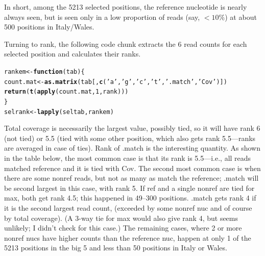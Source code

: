 \documentclass{article}\usepackage[]{graphicx}\usepackage[]{color}
\makeatletter
\newcommand{\hlnum}[1]{\textcolor[rgb]{0.686,0.059,0.569}{#1}}%
\newcommand{\hlstr}[1]{\textcolor[rgb]{0.192,0.494,0.8}{#1}}%
\newcommand{\hlstd}[1]{\textcolor[rgb]{0.345,0.345,0.345}{#1}}%
\newcommand{\hlkwa}[1]{\textcolor[rgb]{0.161,0.373,0.58}{\textbf{#1}}}%
\newcommand{\hlkwb}[1]{\textcolor[rgb]{0.69,0.353,0.396}{#1}}%
\newcommand{\hlkwc}[1]{\textcolor[rgb]{0.333,0.667,0.333}{#1}}%
\newcommand{\hlkwd}[1]{\textcolor[rgb]{0.737,0.353,0.396}{\textbf{#1}}}%
\newenvironment{kframe}{%
 \def\at@end@of@kframe{}%
 \ifinner\ifhmode%
  \def\at@end@of@kframe{\end{minipage}}%
  \begin{minipage}{\columnwidth}%
 \fi\fi%
 \def\FrameCommand##1{\hskip\@totalleftmargin \hskip-\fboxsep
 \colorbox{shadecolor}{##1}\hskip-\fboxsep
     \hskip-\linewidth \hskip-\@totalleftmargin \hskip\columnwidth}%
 \MakeFramed {\advance\hsize-\width
   \@totalleftmargin\z@ \linewidth\hsize
   \@setminipage}}%
 {\par\unskip\endMakeFramed%
 \at@end@of@kframe}
\newenvironment{knitrout}{}{} %
\makeatother
\begin{document}
In short, among the 5213 selected positions, the reference nucleotide is nearly always seen, but is seen only in a low proportion of reads (say, $<10\%$) at about 500 positions in Italy/Wales.

Turning to rank, the following code chunk extracts the 6 read counts for each selected position and calculates their ranks.   

\begin{knitrout}\footnotesize
{}\color{fgcolor}\begin{kframe}
\begin{alltt}
\hlstd{rankem} \hlkwb{<-} \hlkwa{function}\hlstd{(}\hlkwc{tab}\hlstd{)\{}
  \hlstd{count.mat} \hlkwb{<-} \hlkwd{as.matrix}\hlstd{(tab[,}\hlkwd{c}\hlstd{(}\hlstr{'a'}\hlstd{,}\hlstr{'g'}\hlstd{,}\hlstr{'c'}\hlstd{,}\hlstr{'t'}\hlstd{,}\hlstr{'.match'}\hlstd{,} \hlstr{'Cov'}\hlstd{)])}
  \hlkwd{return}\hlstd{(}\hlkwd{t}\hlstd{(}\hlkwd{apply}\hlstd{(count.mat,}\hlnum{1}\hlstd{,rank)))}
\hlstd{\}}
\hlstd{selrank} \hlkwb{<-} \hlkwd{lapply}\hlstd{(seltab,rankem)}
\end{alltt}
\end{kframe}
\end{knitrout}

Total coverage is necessarily the largest value, possibly tied, so it will have rank 6 (not tied) or 5.5 (tied with some other position, which also gets rank 5.5---ranks are averaged in case of ties).  Rank of .match is the interesting quantity.  As shown in the table below, the most common case is that its rank is 5.5---i.e., all reads matched reference and it is tied with Cov.  The second most common case is when there are some nonref reads, but not as many as match the reference; .match will be second largest in this case, with rank 5.    If ref and a single nonref are tied for max, both get rank 4.5; this happened in 49--300 positions.  .match gets rank 4 if it is the second largest read count, (exceeded by some nonref nuc and of course by total coverage).  (A 3-way tie for max would also give rank 4, but seems unlikely; I didn't check for this case.)  The remaining cases, where 2 or more nonref nucs have higher counts than the reference nuc, happen at only 1 of the 5213 positions in the big 5 and less than 50 positions in Italy or Wales. 
\end{document}
